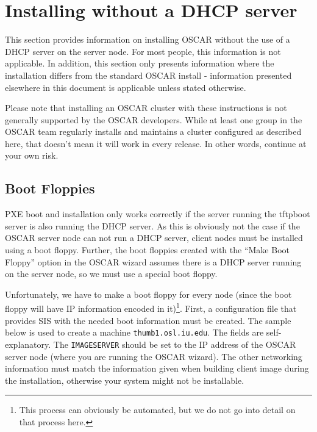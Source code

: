 %
% 
%
%
%

\section{Installing without a DHCP server}
\label{app:no_dhcp}

This section provides information on installing OSCAR without the use
of a DHCP server on the server node.  For most people, this
information is not applicable.  In addition, this section only
presents information where the installation differs from the standard
OSCAR install - information presented elsewhere in this document is
applicable unless stated otherwise.

Please note that installing an OSCAR cluster with these instructions
is not generally supported by the OSCAR developers.  While at least
one group in the OSCAR team regularly installs and maintains a
cluster configured as described here, that doesn't mean it will work
in every release.  In other words, continue at your own risk.

\subsection{Boot Floppies}

PXE boot and installation only works correctly if the server running
the tftpboot server is also running the DHCP server.  As this is
obviously not the case if the OSCAR server node can not run a DHCP
server, client nodes must be installed using a boot floppy.  Further,
the boot floppies created with the ``Make Boot Floppy'' option in the
OSCAR wizard assumes there is a DHCP server running on the server
node, so we must use a special boot floppy.

Unfortunately, we have to make a boot floppy for every node (since the
boot floppy will have IP information encoded in it)\footnote{This
  process can obviously be automated, but we do not go into detail on
  that process here.}.  First, a configuration file that provides SIS
with the needed boot information must be created.  The sample below is
used to create a machine {\tt thumb1.osl.iu.edu}.  The fields are
self-explanatory.  The {\tt IMAGESERVER} should be set to the IP
address of the OSCAR server node (where you are running the OSCAR
wizard).  The other networking information must match the information
given when building client image during the installation, otherwise
your system might not be installable.

